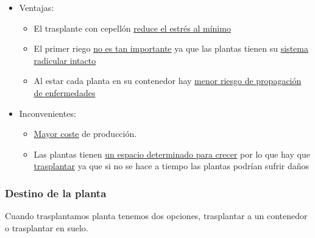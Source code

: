 \documentclass[a4paper,12pt,oneside]{article}
\begin{document}
\begin{enumerate}
\begin{itemize}
\item Ventajas:\\
\begin{itemize}
\item El trasplante con cepellón \uline{reduce el estrés al mínimo}
\item El primer riego \uline{no es tan importante} ya que las plantas tienen su
\uline{sistema radicular intacto}
\item Al estar cada planta en su contenedor hay \uline{menor riesgo de propagación de
enfermedades}
\end{itemize}
\item Inconvenientes:\\
\begin{itemize}
\item \uline{Mayor coste} de producción.
\item Las plantas tienen \uline{un espacio determinado para crecer} por lo que hay que
\uline{trasplantar} ya que si no se hace a tiempo las plantas podrían sufrir
daños
\end{itemize}
\end{itemize}
\end{enumerate}

\subsubsection{Destino de la planta}
\label{sec:org6e2c75e}
Cuando trasplantamos planta tenemos dos opciones, trasplantar a un contenedor
o trasplantar en suelo. 
\end{document}
